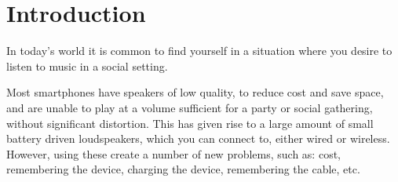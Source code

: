 \chapter{Introduction}\label{cha:introduction}
In today's world it is common to find yourself in a situation where you desire to listen to music in a social setting.

Most smartphones have speakers of low quality, to reduce cost and save space, and are unable to play at a volume sufficient for a party or social gathering, without significant distortion.
This has given rise to a large amount of small battery driven loudspeakers, which you can connect to, either wired or wireless.
However, using these create a number of new problems, such as: cost, remembering the device, charging the device, remembering the cable, etc.

